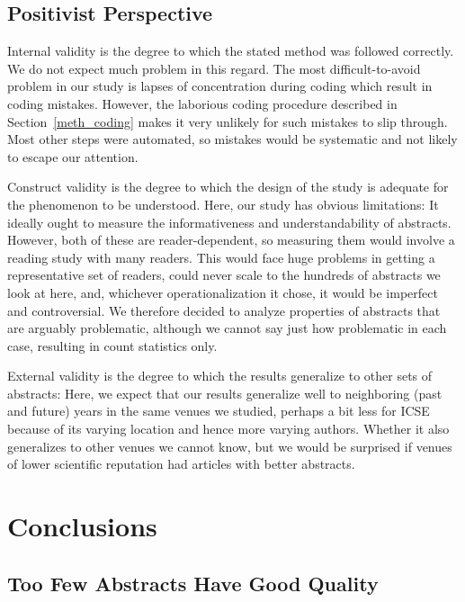 \documentclass[10pt,journal,compsoc]{IEEEtran}
\begin{document}
\subsection{Positivist Perspective}

Internal validity is the degree to which the stated method
was followed correctly.
We do not expect much problem in this regard.
The most difficult-to-avoid problem in our study is lapses of concentration
during coding which result in coding mistakes.
However, the laborious coding procedure
described in Section~\ref{meth_coding}
makes it very unlikely for such mistakes to slip through.
Most other steps were automated, so mistakes would be systematic
and not likely to escape our attention.

Construct validity is the degree to which the design
of the study is adequate for the phenomenon to be understood.
Here, our study has obvious limitations:
It ideally ought to measure the informativeness and understandability of
abstracts. However, both of these are reader-dependent, so
measuring them would involve a reading study with many readers.
This would face huge problems in getting a representative set of readers,
could never scale to the hundreds of abstracts we look at here,
and, whichever operationalization it chose,
it would be imperfect and controversial.
We therefore decided to analyze properties of abstracts
that are arguably problematic, although we cannot say just how
problematic in each case, resulting in count statistics only.

External validity is the degree to which the results generalize
to other sets of abstracts:
Here, we expect that our results generalize well to
neighboring (past and future) years in the same venues
we studied, perhaps a bit less for ICSE because of its
varying location and hence more varying authors.
Whether it also generalizes to other venues
we cannot know, but we would be surprised if venues of lower
scientific reputation had articles with better abstracts.


\section{Conclusions}


\subsection{Too Few Abstracts Have Good Quality}
\end{document}
